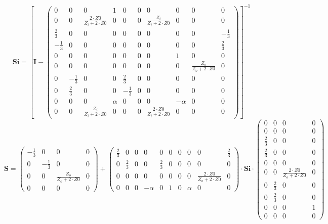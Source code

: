 \[ \mathbf{Si} =  \left[ \mathbf{I}  - \left(\begin{smallmatrix} 0 & 0 & 0 & 1 & 0 & 0 & 0 & 0 & 0 & 0 \\ 0 & 0 & \frac{2\cdot Z0}{Z_i+2\cdot Z0} & 0 & 0 & 0 & \frac{Z_i}{Z_i+2\cdot Z0} & 0 & 0 & 0 \\ \frac{2}{3} & 0 & 0 & 0 & 0 & 0 & 0 & 0 & 0 & -\frac{1}{3} \\ -\frac{1}{3} & 0 & 0 & 0 & 0 & 0 & 0 & 0 & 0 & \frac{2}{3} \\ 0 & 0 & 0 & 0 & 0 & 0 & 0 & 1 & 0 & 0 \\ 0 & 0 & 0 & 0 & 0 & 0 & 0 & 0 & \frac{Z_o}{Z_o+2\cdot Z0} & 0 \\ 0 & -\frac{1}{3} & 0 & 0 & \frac{2}{3} & 0 & 0 & 0 & 0 & 0 \\ 0 & \frac{2}{3} & 0 & 0 & -\frac{1}{3} & 0 & 0 & 0 & 0 & 0 \\ 0 & 0 & 0 & \alpha & 0 & 0 & 0 & -\alpha & 0 & 0 \\ 0 & 0 & \frac{Z_i}{Z_i+2\cdot Z0} & 0 & 0 & 0 & \frac{2\cdot Z0}{Z_i+2\cdot Z0} & 0 & 0 & 0 \end{smallmatrix}\right) \right]^{-1}  \]
\[ \mathbf{S} = \left(\begin{smallmatrix} -\frac{1}{3} & 0 & 0 & 0 \\ 0 & -\frac{1}{3} & 0 & 0 \\ 0 & 0 & \frac{Z_o}{Z_o+2\cdot Z0} & 0 \\ 0 & 0 & 0 & 0 \end{smallmatrix}\right) + \left(\begin{smallmatrix} \frac{2}{3} & 0 & 0 & 0 & 0 & 0 & 0 & 0 & 0 & \frac{2}{3} \\ 0 & \frac{2}{3} & 0 & 0 & \frac{2}{3} & 0 & 0 & 0 & 0 & 0 \\ 0 & 0 & 0 & 0 & 0 & 0 & 0 & 0 & \frac{2\cdot Z0}{Z_o+2\cdot Z0} & 0 \\ 0 & 0 & 0 & -\alpha & 0 & 1 & 0 & \alpha & 0 & 0 \end{smallmatrix}\right) \cdot \mathbf{Si} \cdot\left(\begin{smallmatrix} 0 & 0 & 0 & 0 \\ 0 & 0 & 0 & 0 \\ \frac{2}{3} & 0 & 0 & 0 \\ \frac{2}{3} & 0 & 0 & 0 \\ 0 & 0 & 0 & 0 \\ 0 & 0 & \frac{2\cdot Z0}{Z_o+2\cdot Z0} & 0 \\ 0 & \frac{2}{3} & 0 & 0 \\ 0 & \frac{2}{3} & 0 & 0 \\ 0 & 0 & 0 & 1 \\ 0 & 0 & 0 & 0 \end{smallmatrix}\right) \]
